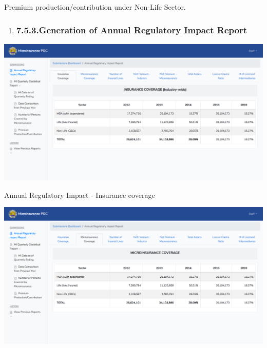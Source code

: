 \documentclass{article}
\begin{document}
Premium production/contribution under Non-Life
Sector.%

\begin{enumerate}[noitemsep,topsep=\mdcompacttopsep]%

\item{}
\subsubsection{7.5.3.\hspace*{0.5em}Generation of Annual Regulatory Impact Report}\label{sec-generation-of-annual-regulatory-impact-report}%
\end{enumerate}%

\noindent{}\includegraphics[keepaspectratio=true]{up-ic-screens/image105}{}%

Annual Regulatory Impact - Insurance coverage%

\includegraphics[keepaspectratio=true]{up-ic-screens/image165}{}%
\end{document}
